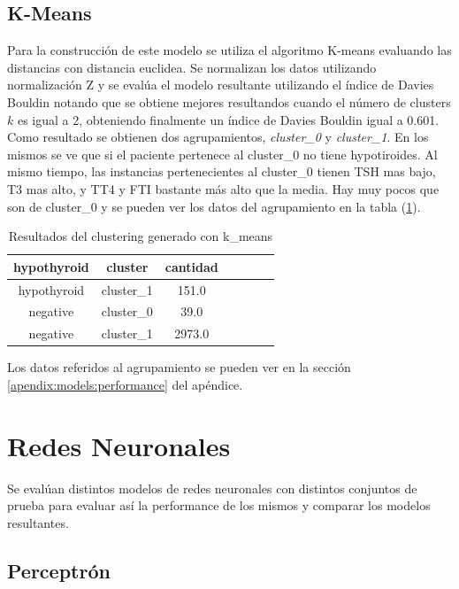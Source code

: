 \documentclass[osajnl,twocolumn,showpacs,superscriptaddress,10pt,floatfix]{revtex4-1} %
\begin{document}
\subsection{K-Means}

Para la construcción de este modelo se utiliza el algoritmo K-means evaluando las distancias con distancia euclidea. Se normalizan los datos utilizando normalización Z y se evalúa el modelo resultante utilizando el índice de Davies Bouldin notando que se obtiene mejores resultandos cuando el número de clusters $k$ es igual a 2, obteniendo finalmente un índice de Davies Bouldin igual a 0.601. \\

Como resultado se obtienen dos agrupamientos, \textit{cluster\_0} y \textit{cluster\_1}. En los mismos se ve que si el paciente pertenece al cluster\_0 no tiene hypotiroides. Al mismo tiempo, las instancias pertenecientes al cluster\_0 tienen TSH mas bajo, T3 mas alto, y TT4 y FTI bastante más alto que la media. Hay muy pocos que son de cluster\_0 y se pueden ver los datos del agrupamiento en la tabla (\ref{table:k_means}).


\begin{table}[h!]
    \centering
    \begin{tabular}{ccccccc}
        hypothyroid & cluster & cantidad \\
        \hline
        hypothyroid & cluster\_1 & 151.0 \\
        negative & cluster\_0 & 39.0 \\
        negative  & cluster\_1 & 2973.0 \\
        \hline
    \end{tabular}
    \caption{Resultados del clustering generado con k\_means}
    \label{table:k_means}
\end{table}

Los datos referidos al agrupamiento se pueden ver  en la sección \ref{apendix:models:performance} del apéndice. \\

\section{Redes Neuronales}

Se evalúan distintos modelos de redes neuronales con distintos conjuntos de prueba para evaluar así la performance de los mismos y comparar los modelos resultantes.

\subsection{Perceptrón}
\end{document}
